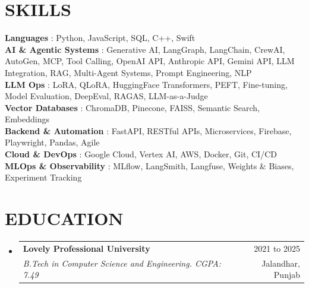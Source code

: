 \documentclass[a4paper,11pt]{article}
\makeatletter
\newcommand{\resumeSubheading}[4]{
  \vspace{-2pt}\item
    \begin{tabular*}{\textwidth}[t]{l@{\extracolsep{\fill}}r}
      \textbf{#1} & {\color{dark-grey}\small #2}\vspace{0pt}\\
      \textit{#3} & {\color{dark-grey} \small #4}\\
    \end{tabular*}\vspace{-6pt}
}
\newcommand{\resumeSubHeadingListStart}{\begin{itemize}[leftmargin=0in, label={}]}
\newcommand{\resumeSubHeadingListEnd}{\end{itemize}\vspace{-6pt}}
\makeatother
\begin{document}
\section{SKILLS}
 \begin{itemize}[leftmargin=0in, label={}]
    \small{\item{
     \textbf{Languages} {: Python, JavaScript, SQL, C++, Swift}\vspace{1pt} \\
     \textbf{AI \& Agentic Systems} {: Generative AI, LangGraph, LangChain, CrewAI, AutoGen, MCP, Tool Calling, OpenAI API, Anthropic API, Gemini API, LLM Integration, RAG, Multi-Agent Systems, Prompt Engineering, NLP}\vspace{1pt} \\
     \textbf{LLM Ops} {: LoRA, QLoRA, HuggingFace Transformers, PEFT, Fine-tuning, Model Evaluation, DeepEval, RAGAS, LLM-as-a-Judge}\vspace{1pt} \\
     \textbf{Vector Databases} {: ChromaDB, Pinecone, FAISS, Semantic Search, Embeddings}\vspace{1pt} \\
     \textbf{Backend \& Automation} {: FastAPI, RESTful APIs, Microservices, Firebase, Playwright, Pandas, Agile}\vspace{1pt} \\
     \textbf{Cloud \& DevOps} {: Google Cloud, Vertex AI, AWS, Docker, Git, CI/CD}\vspace{1pt} \\
     \textbf{MLOps \& Observability} {: MLflow, LangSmith, Langfuse, Weights \& Biases, Experiment Tracking}
    }}
 \end{itemize}\vspace{-8pt}

\section{EDUCATION}
  \resumeSubHeadingListStart
    \resumeSubheading
      {Lovely Professional University}{2021 to 2025}
      {B.Tech in Computer Science and Engineering. CGPA: 7.49}{Jalandhar, Punjab}
  \resumeSubHeadingListEnd

\end{document}
